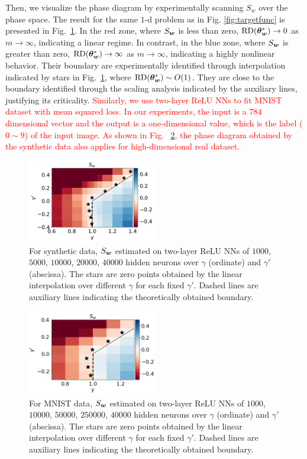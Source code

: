 \documentclass[twoside,11pt]{article}
\begin{document}
Then, we visualize the phase diagram by experimentally scanning $S_w$ over the phase space. The result for the same $1$-d problem as in Fig. \ref{fig:targetfunc} is presented in Fig.~\ref{fig:wds}. In the red zone, where $S_{\bm{w}}$ is less than zero, $\mathrm{RD}(\bm{\theta}^*_{\bm{w}})\to0$ as $m\to\infty$, indicating a linear regime. In contrast, in the blue zone, where $S_{\bm{w}}$ is greater than zero, $\mathrm{RD}(\bm{\theta}^*_{\bm{w}})\to \infty$ as $m\to\infty$, indicating a highly nonlinear behavior. Their boundary are experimentally identified through interpolation indicated by stars in Fig.~\ref{fig:wds}, where $\mathrm{RD}(\bm{\theta}^*_{\bm{w}})\sim O(1)$. They are close to the boundary identified through the scaling analysis indicated by the auxiliary lines, justifying its criticality. \textcolor{red}{Similarly, we use two-layer ReLU NNs to fit MNIST dataset with mean squared loss. In our experiments, the input is a $784$ dimensional vector and the output is a one-dimensional value, which is the label ($0\sim9$) of the input image. As shown in Fig.~ \ref{fig:mnistwds}, the phase diagram obtained by the synthetic data also applies for high-dimensional real dataset. }
\begin{figure}
    \centering
    \includegraphics[width=0.5\textwidth]{pic/systemexplarg3/scalestudy3/rescale_w_slope.pdf}
    \caption{For synthetic data, $S_{\bm{w}}$ estimated on two-layer ReLU NNs of $1000$, $5000$, $10000$, $20000$, $40000$ hidden neurons over $\gamma$ (ordinate) and $\gamma'$ (abscissa). The stars are zero points obtained by the linear interpolation over different $\gamma$ for each fixed $\gamma'$. Dashed lines are auxiliary lines indicating the theoretically obtained boundary.}
    \label{fig:wds}
\end{figure}

\begin{figure}
    \centering
    \includegraphics[width=0.5\textwidth]{pic/scalestudym2/rescale_w_slope.png}
    \caption{For MNIST data, $S_{\bm{w}}$ estimated on two-layer ReLU NNs of $1000$, $10000$, $50000$, $250000$, $40000$ hidden neurons over $\gamma$ (ordinate) and $\gamma'$ (abscissa). The stars are zero points obtained by the linear interpolation over different $\gamma$ for each fixed $\gamma'$. Dashed lines are auxiliary lines indicating the theoretically obtained boundary.}
    \label{fig:mnistwds}
\end{figure}
\end{document}
